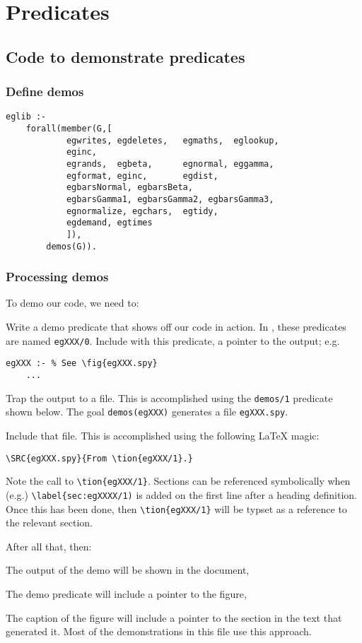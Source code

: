\section{ Predicates
}
\subsection{ Code to demonstrate predicates
}
\subsubsection{ Define demos }\begin{Verbatim}
eglib :- 
    forall(member(G,[
            egwrites, egdeletes,   egmaths,  eglookup,
            eginc, 
            egrands,  egbeta,      egnormal, eggamma,
            egformat, eginc,       egdist, 
            egbarsNormal, egbarsBeta,
            egbarsGamma1, egbarsGamma2, egbarsGamma3,
            egnormalize, egchars,  egtidy,
            egdemand, egtimes
            ]),
        demos(G)).
\end{Verbatim}
\subsubsection{ Processing demos
}
 To demo our code, we need to:
\bi
\item Write a demo predicate that shows off our code in action.
 In {\PROD}, these predicates are named  {\tt egXXX/0}. 
 Include with this predicate, 
 a pointer to the output; e.g.
\begin{verbatim}
egXXX :- % See \fig{egXXX.spy}
    ... 
\end{verbatim}
\item Trap the output to a file. This is accomplished using
the {\tt demos/1} predicate shown below. The goal
{\tt demos(egXXX)} generates a file {\tt egXXX.spy}. 
\item Include that file. This is accomplished using
the following {\LaTeX} magic:
\begin{verbatim}
\SRC{egXXX.spy}{From \tion{egXXX/1}.}
\end{verbatim}
\ei
Note the call to \verb+\tion{egXXX/1}+.
Sections can be referenced
symbolically 
when (e.g.) \verb+\label{sec:egXXXX/1)+
is added on the first line after a heading definition.
Once this has been done, then \verb+\tion{egXXX/1}+ will
be typset as a reference to the relevant section.

After all that, then:
\bi
\item The output of the demo will be shown in the document,
\item
The demo predicate will include a pointer to the figure,
\item
The caption of the figure will include a pointer to the section
in the text that generated it. 
\ei
Most of the demonstrations in this file use this approach.

